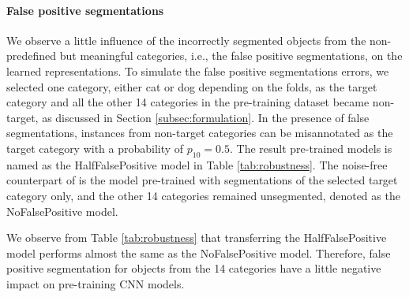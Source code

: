 \paragraph{False positive segmentations}
We observe a little influence of the incorrectly segmented objects from the non-predefined but meaningful categories, i.e., the false positive segmentations, on the learned representations.
To simulate the false positive segmentations errors, we selected one category, either cat or dog depending on the folds, as the target category and all the other 14 categories in the pre-training dataset became non-target, as discussed in Section \ref{subsec:formulation}.
In the presence of false segmentations, instances from non-target categories can be misannotated as the target category with a probability of $p_{10}= 0.5$.
The result pre-trained models is named as the HalfFalsePositive model in Table \ref{tab:robustness}.
The noise-free counterpart of is the model pre-trained with segmentations of the selected target category only, and the other 14 categories remained unsegmented, denoted as the NoFalsePositive model.

We observe from Table \ref{tab:robustness} that transferring the HalfFalsePositive model performs almost the same as the NoFalsePositive model.
Therefore, false positive segmentation for objects from the 14 categories have a little negative impact on pre-training CNN models.

